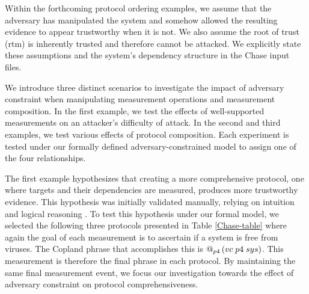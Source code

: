 \documentclass[runningheads]{llncs}
\theoremstyle{definition}
\begin{document}
%     

Within the forthcoming protocol ordering examples, we assume that the adversary has manipulated the system and somehow allowed the resulting evidence to appear trustworthy when it is not. We also assume the root of trust (rtm) is inherently trusted and therefore cannot be attacked. We explicitly state these assumptions and the system's dependency structure in the Chase input files.

We introduce three distinct scenarios to investigate the impact of adversary constraint when manipulating measurement operations and measurement composition. In the first example, we test the effects of well-supported measurements on an attacker's difficulty of attack. In the second and third examples, we test various effects of protocol composition. Each experiment is tested under our formally defined adversary-constrained model to assign one of the four relationships.

The first example hypothesizes that creating a more comprehensive protocol, one where targets and their dependencies are measured, produces more trustworthy evidence. This hypothesis was initially validated manually, relying on intuition and logical reasoning \cite{Rowe:2016:Confining}. To test this hypothesis under our formal model, we selected the following three protocols presented in Table \ref{Chase-table} where again the goal of each measurement is to ascertain if a system is free from viruses. The Copland phrase that accomplishes this is $\mathop{@_{p4}}{(vc\; p4\; sys)}$. This measurement is therefore the final phrase in each protocol. By maintaining the same final measurement event, we focus our investigation towards the effect of adversary constraint on protocol comprehensiveness.
\end{document}
